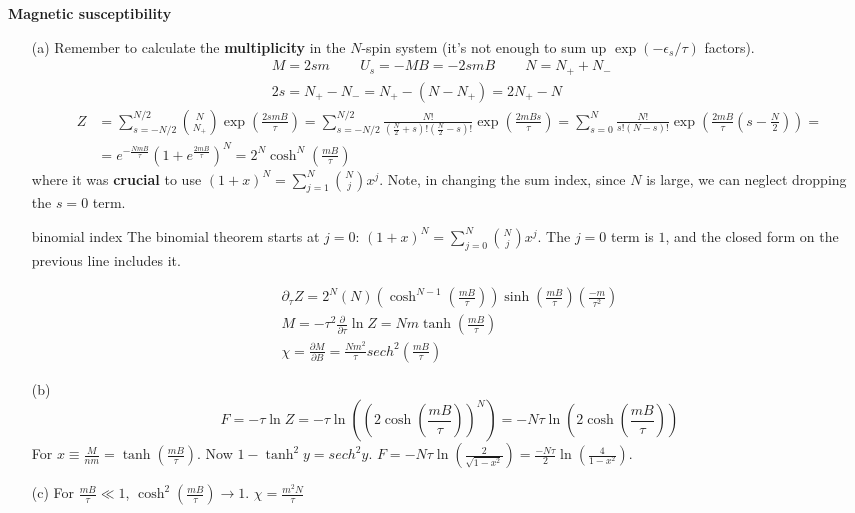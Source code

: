  \textbf{Magnetic susceptibility} 
\begin{itemize}
\item[(a)] Remember to calculate the \textbf{multiplicity} in the $N$-spin system (it's not enough to sum up $\exp{(-\epsilon_s /\tau) }$ factors).  
\[
\begin{gathered}
  M = 2sm \quad \quad \, U_s = - MB = -2sm B \quad \quad \, N = N_+ + N_- \quad \, \\ 
  2s = N_+ - N_- = N_+ - (N - N_+ ) = 2N_+ - N
\end{gathered}
\] 
\[
\begin{aligned}
  Z & = \sum_{s=-N/2}^{N/2} \binom{N}{N_+} \exp{ \left( \frac{ 2 s m B}{\tau} \right) } = \sum_{ s = -N/2}^{N/2} \frac{ N!}{ \left( \frac{N}{2} + s \right)! \left( \frac{N}{2} -s \right)! } \exp{ \left( \frac{2 m B s}{\tau} \right) } = \sum_{s=0}^N \frac{N! }{ s! (N-s)! } \exp{ \left( \frac{2mB}{\tau} \left( s - \frac{N}{2} \right) \right) } = \\
  & = e^{-\frac{NmB}{\tau} } (1 + e^{\frac{2mB}{\tau}} )^N = 2^N \cosh^N{\left( \frac{mB}{\tau} \right) }
\end{aligned}
\]
where it was \textbf{crucial} to use $(1+ x)^N = \sum_{j=1}^N \binom{N}{j} x^j$.  Note, in changing the sum index, since $N$ is large, we can neglect dropping the $s=0$ term.
\begin{correction}{binomial index}
The binomial theorem starts at $j=0$: $(1+x)^N = \sum_{j=0}^{N} \binom{N}{j} x^j$.
The $j=0$ term is $1$, and the closed form on the previous line includes it.
\end{correction}  
\[
\begin{gathered}
  \partial_{\tau} Z = 2^N (N) (\cosh^{N-1}{\left( \frac{mB}{\tau} \right) } ) \sinh{ \left( \frac{mB}{\tau} \right) } \left( \frac{-m}{\tau^2 }\right)  \\
  M  = -\tau^2 \frac{\partial }{\partial \tau} \ln{Z} = N m \tanh{ \left( \frac{mB}{\tau } \right) } \\ 
\chi = \frac{\partial M}{\partial B} = \frac{Nm^2}{\tau} sech^2{\left( \frac{mB}{\tau} \right) }
\end{gathered}
\]
\item[(b)]
\[
F = -\tau \ln{Z} = -\tau \ln{ \left( (2\cosh{ \left( \frac{mB}{\tau} \right) } )^N \right)} = -N\tau \ln{ (2 \cosh{ \left( \frac{mB}{\tau} \right) } )}
\]
For $x \equiv \frac{ M}{ nm } = \tanh{ \left( \frac{mB}{\tau} \right) }$.  Now $1 - \tanh^2{y} = sech^2{y}$.  $F = - N \tau \ln{ \left( \frac{2}{ \sqrt{ 1 - x^2 } } \right) } = \frac{- N\tau}{2} \ln{ \left( \frac{4}{1 - x^2} \right) }$.  
\item[(c)] For $\frac{mB}{\tau} \ll 1$, $\cosh^2{\left( \frac{mB}{\tau} \right)} \to 1$.  $\boxed{ \chi = \frac{m^2 N}{\tau} }$
\end{itemize}






